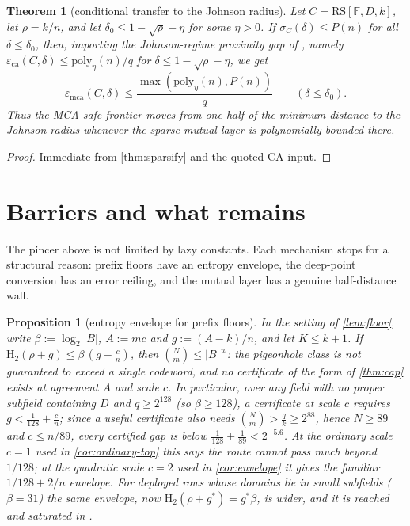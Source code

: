 \documentclass[11pt]{amsart}
\newtheorem{theorem}{Theorem}[section]
\newtheorem{proposition}[proposition]{Proposition}
\theoremstyle{definition}
\theoremstyle{remark}
\newcommand{\F}{\mathbb{F}}
\newcommand{\RS}{\mathrm{RS}}
\newcommand{\eca}{\varepsilon_{\mathrm{ca}}}
\newcommand{\emca}{\varepsilon_{\mathrm{mca}}}
\newcommand{\Hb}{\mathrm{H}_2}
\begin{document}
\begin{theorem}[conditional transfer to the Johnson radius]\label{thm:transfer}
Let $C=\RS[\F,D,k]$, let $\rho=k/n$, and let $\delta_0\le1-\sqrt\rho-\eta$ for some $\eta>0$.  If $\sigma_C(\delta)\le P(n)$ for all $\delta\le\delta_0$, then, importing the Johnson-regime proximity gap of \textup{\cite{BCIKS20}}, namely $\eca(C,\delta)\le\mathrm{poly}_\eta(n)/q$ for $\delta\le1-\sqrt\rho-\eta$, we get
\[
        \emca(C,\delta)\le\frac{\max(\mathrm{poly}_\eta(n),P(n))}{q}
        \qquad(\delta\le\delta_0).
\]
Thus the MCA safe frontier moves from one half of the minimum distance to the Johnson radius whenever the sparse mutual layer is polynomially bounded there.
\end{theorem}

\begin{proof}
Immediate from \cref{thm:sparsify} and the quoted CA input.
\end{proof}

\section{Barriers and what remains}\label{sec:barriers}

The pincer above is not limited by lazy constants.  Each mechanism stops for a
structural reason: prefix floors have an entropy envelope, the deep-point
conversion has an error ceiling, and the mutual layer has a genuine
half-distance wall.

\begin{proposition}[entropy envelope for prefix floors]\label{prop:envelope-barrier}
In the setting of \cref{lem:floor}, write $\beta:=\log_2|B|$, $A:=mc$ and
$g:=(A-k)/n$, and let $K\le k+1$. If
$\Hb(\rho+g)\le\beta\,(g-\tfrac cn)$, then $\binom Nm\le|B|^{\,w}$: the
pigeonhole class is not guaranteed to exceed a single codeword, and no
certificate of the form of \cref{thm:cap} exists at agreement $A$ and scale $c$.
In particular, over any field with no proper subfield containing $D$ and
$q\ge2^{128}$ (so $\beta\ge128$), a certificate at scale $c$ requires
$g<\frac1{128}+\frac cn$; since a useful certificate also needs
$\binom Nm>\frac qk\ge2^{88}$, hence $N\ge89$ and $c\le n/89$, every certified
gap is below $\frac1{128}+\frac1{89}<2^{-5.6}$. At the ordinary scale $c=1$ used
in \cref{cor:ordinary-top} this says the route cannot pass much beyond
$1/128$; at the quadratic scale $c=2$ used in \cref{cor:envelope} it gives the
familiar $1/128+2/n$ envelope. For deployed rows whose domains lie in small
subfields ($\beta=31$) the same envelope, now $\Hb(\rho+g^*)=g^*\beta$, is wider,
and it is reached and saturated in \cite{Cho26b}.
\end{proposition}
\end{document}
